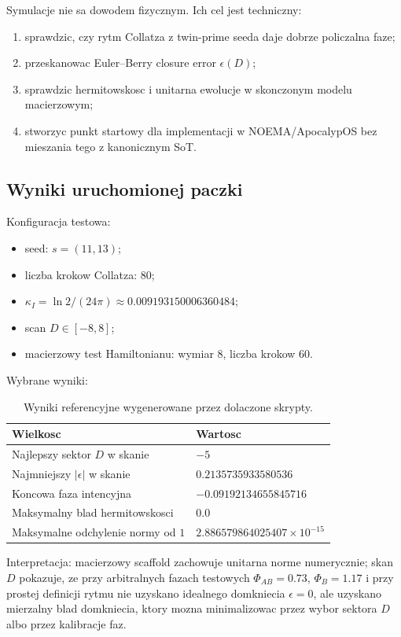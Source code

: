 \documentclass[11pt,a4paper]{article}
\newcommand{\kappaI}{\kappa_I}
\begin{document}
Symulacje nie sa dowodem fizycznym. Ich cel jest techniczny:
\begin{enumerate}[leftmargin=*]
\item sprawdzic, czy rytm Collatza z twin-prime seeda daje dobrze policzalna faze;
\item przeskanowac Euler--Berry closure error $\epsilon(D)$;
\item sprawdzic hermitowskosc i unitarna ewolucje w skonczonym modelu macierzowym;
\item stworzyc punkt startowy dla implementacji w NOEMA/ApocalypOS bez mieszania tego z kanonicznym SoT.
\end{enumerate}

\subsection{Wyniki uruchomionej paczki}

Konfiguracja testowa:
\begin{itemize}[leftmargin=*]
\item seed: $s=(11,13)$;
\item liczba krokow Collatza: $80$;
\item $\kappaI=\ln2/(24\pi)\approx 0.009193150006360484$;
\item scan $D\in[-8,8]$;
\item macierzowy test Hamiltonianu: wymiar $8$, liczba krokow $60$.
\end{itemize}

Wybrane wyniki:
\begin{table}[h]
\centering
\begin{tabular}{ll}
\toprule
Wielkosc & Wartosc \\
\midrule
Najlepszy sektor $D$ w skanie & $-5$ \\
Najmniejszy $|\epsilon|$ w skanie & $0.2135735933580536$ \\
Koncowa faza intencyjna & $-0.09192134655845716$ \\
Maksymalny blad hermitowskosci & $0.0$ \\
Maksymalne odchylenie normy od $1$ & $2.886579864025407\times10^{-15}$ \\
\bottomrule
\end{tabular}
\caption{Wyniki referencyjne wygenerowane przez dolaczone skrypty.}
\end{table}

Interpretacja: macierzowy scaffold zachowuje unitarna norme numerycznie; skan $D$ pokazuje, ze przy arbitralnych fazach testowych $\Phi_{AB}=0.73$, $\Phi_B=1.17$ i przy prostej definicji rytmu nie uzyskano idealnego domkniecia $\epsilon=0$, ale uzyskano mierzalny blad domkniecia, ktory mozna minimalizowac przez wybor sektora $D$ albo przez kalibracje faz.
\end{document}
